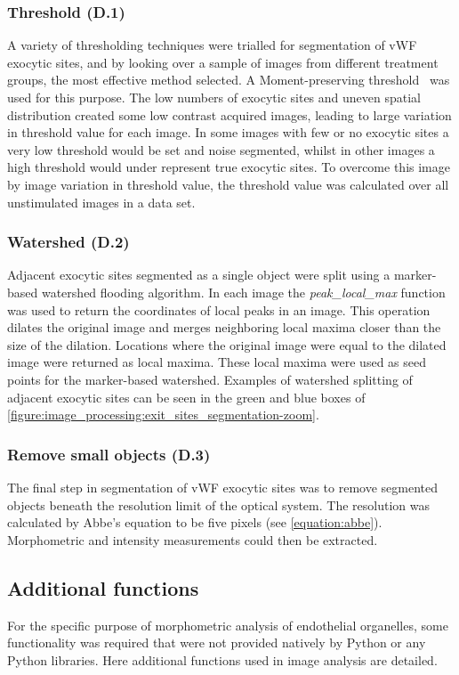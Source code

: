 \subsubsection{Threshold (D.1)}
A variety of thresholding techniques were trialled for segmentation of vWF exocytic sites, and by looking over a sample of images from different treatment groups, the most effective method selected. A Moment-preserving threshold~\cite{Tsai1985} was used for this purpose. The low numbers of exocytic sites and uneven spatial distribution created some low contrast acquired images, leading to large variation in threshold value for each image. In some images with few or no exocytic sites a very low threshold would be set and noise segmented, whilst in other images a high threshold would under represent true exocytic sites. To overcome this image by image variation in threshold value, the threshold value was calculated over all unstimulated images in a data set.

\subsubsection{Watershed (D.2)}
Adjacent exocytic sites segmented as a single object were split using a marker-based watershed flooding algorithm. In each image the \emph{peak\_local\_max} function was used to return the coordinates of local peaks in an image. This operation dilates the original image and merges neighboring local maxima closer than the size of the dilation. Locations where the original image were equal to the dilated image were returned as local maxima. These local maxima were used as seed points for the marker-based watershed. Examples of watershed splitting of adjacent exocytic sites can be seen in the green and blue boxes of \autoref{figure:image_processing:exit_sites_segmentation-zoom}.

\subsubsection{Remove small objects (D.3)}
The final step in segmentation of vWF exocytic sites was to remove segmented objects beneath the resolution limit of the optical system. The resolution was calculated by Abbe's equation to be five pixels (see \autoref{equation:abbe}). Morphometric and intensity measurements could then be extracted.

\subsection{Additional functions}
\label{endothelial_morphometry:image_processing:additiona_functions}
For the specific purpose of morphometric analysis of endothelial organelles, some functionality was required that were not provided natively by Python or any Python libraries. Here additional functions used in image analysis are detailed.

